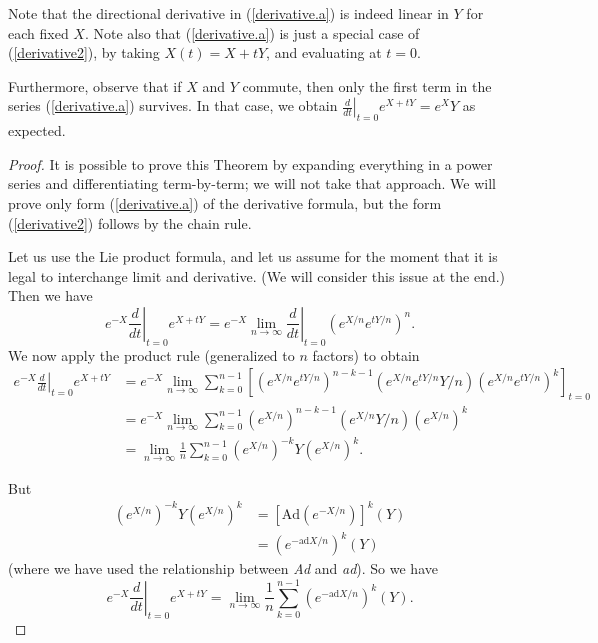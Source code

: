 \documentclass[12pt]{amsbook}
\theoremstyle{plain}
\numberwithin{equation}{chapter}
\numberwithin{theorem}{chapter}
\begin{document}
Note that the directional derivative in (\ref{derivative.a}) is indeed linear
in $Y$ for each fixed $X$. Note also that (\ref{derivative.a}) is just a
special case of (\ref{derivative2}), by taking $X(t)=X+tY$, and evaluating at
$t=0$.

Furthermore, observe that if $X$ and $Y$ commute, then only the first term in
the series (\ref{derivative.a}) survives. In that case, we obtain $\left.
\frac d{dt}\right|  _{t=0}e^{X+tY}=e^{X}Y$ as expected.

\begin{proof}
It is possible to prove this Theorem by expanding everything in a power series
and differentiating term-by-term; we will not take that approach. We will
prove only form (\ref{derivative.a}) of the derivative formula, but the form
(\ref{derivative2}) follows by the chain rule.

Let us use the Lie product formula, and let us assume for the moment that it
is legal to interchange limit and derivative. (We will consider this issue at
the end.) Then we have
\[
e^{-X}\left.  \frac{d}{dt}\right|  _{t=0}e^{X+tY}=e^{-X}\lim_{n\rightarrow
\infty}\left.  \frac{d}{dt}\right|  _{t=0}\left(  e^{X/n}e^{tY/n}\right)
^{n}\text{.}%
\]
We now apply the product rule (generalized to $n$ factors) to obtain
\begin{align*}
e^{-X}\left.  \frac{d}{dt}\right|  _{t=0}e^{X+tY}  & =e^{-X}\lim
_{n\rightarrow\infty}\sum_{k=0}^{n-1}\left[  \left(  e^{X/n}e^{tY/n}\right)
^{n-k-1}\left(  e^{X/n}e^{tY/n}Y/n\right)  \left(  e^{X/n}e^{tY/n}\right)
^{k}\right]  _{t=0}\\
& =e^{-X}\lim_{n\rightarrow\infty}\sum_{k=0}^{n-1}\left(  e^{X/n}\right)
^{n-k-1}\left(  e^{X/n}Y/n\right)  \left(  e^{X/n}\right)  ^{k}\\
& =\lim_{n\rightarrow\infty}\frac{1}{n}\sum_{k=0}^{n-1}\left(  e^{X/n}\right)
^{-k}Y\left(  e^{X/n}\right)  ^{k}\text{.}%
\end{align*}

But
\begin{align*}
\left(  e^{X/n}\right)  ^{-k}Y\left(  e^{X/n}\right)  ^{k}  & =\left[
\mathrm{Ad}\left(  e^{-X/n}\right)  \right]  ^{k}\left(  Y\right)  \\
& =\left(  e^{-\mathrm{ad}X/n}\right)  ^{k}(Y)
\end{align*}
(where we have used the relationship between \textit{Ad} and \textit{ad}). So
we have
\begin{equation}
e^{-X}\left.  \frac{d}{dt}\right|  _{t=0}e^{X+tY}=\lim_{n\rightarrow\infty
}\frac{1}{n}\sum_{k=0}^{n-1}\left(  e^{-\mathrm{ad}X/n}\right)  ^{k}%
(Y)\text{.}\label{derivative.series}%
\end{equation}


\end{proof}
\end{document}
